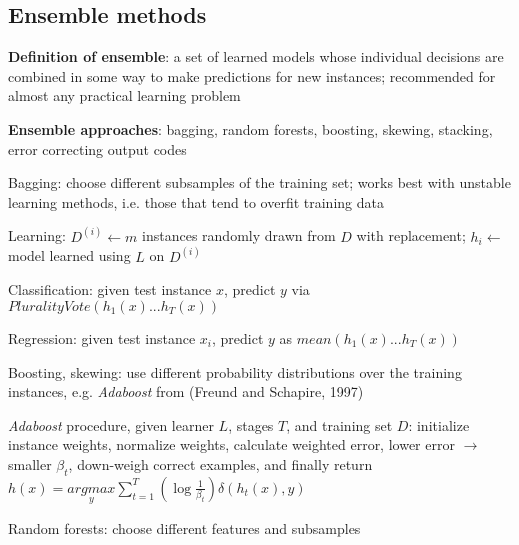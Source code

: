 \documentclass[letterpaper,fontsize=5pt]{scrartcl}
\renewenvironment{enumerate}[1]{\begin{compactenum}#1}{\end{compactenum}}
\theoremstyle{definition}
\begin{document}
\begin{multicols}{2}
\section{Ensemble methods}
	\begin{enumerate}
		\item \textbf{Definition of ensemble}: a set of learned models whose individual decisions are combined in some way to make predictions for new instances; recommended for almost any practical learning problem
		\item \textbf{Ensemble approaches}: bagging, random forests, boosting, skewing, stacking, error correcting output codes
			\begin{enumerate}
				\item Bagging: choose different subsamples of the training set; works best with unstable learning methods, i.e. those that tend to overfit training data
					\begin{enumerate}
						\item Learning: $D^{(i)} \leftarrow m$ instances randomly drawn from $D$ with replacement; $h_i \leftarrow$ model learned using $L$ on $D^{(i)}$
						\item Classification: given test instance $x$, predict $y$ via $PluralityVote(h_1(x) ... h_T(x))$
						\item Regression: given test instance $x_i$, predict $y$ as $mean(h_1(x) ... h_T(x))$
					\end{enumerate}
				\item Boosting, skewing: use different probability distributions over the training instances, e.g. \emph{Adaboost} from (Freund and Schapire, 1997)
					\begin{enumerate}
						\item \emph{Adaboost} procedure, given learner $L$, stages $T$, and training set $D$: initialize instance weights, normalize weights, calculate weighted error, lower error $\rightarrow$ smaller $\beta_t$, down-weigh correct examples, and finally return $h(x) = \underset{y}{argmax} \sum\limits_{t=1}^T (\log \frac{1}{\beta_t}) \delta(h_t(x),y)$
					\end{enumerate}
				\item Random forests: choose different features and subsamples
			\end{enumerate}
	\end{enumerate}

\end{multicols}
\end{document}
